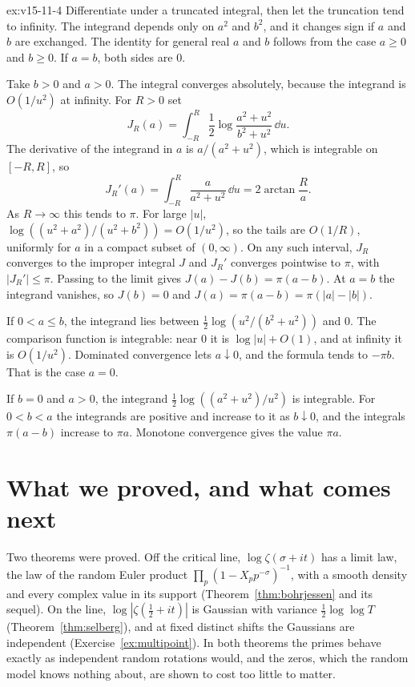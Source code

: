 \begin{solution}{ex:v15-11-4}
\idea Differentiate under a truncated integral, then let the truncation tend to infinity.
\writeup The integrand depends only on \(a^2\) and \(b^2\), and it changes sign if \(a\) and \(b\) are exchanged. The identity for general real \(a\) and \(b\) follows from the case \(a\ge0\) and \(b\ge0\). If \(a=b\), both sides are \(0\).

Take \(b>0\) and \(a>0\). The integral converges absolutely, because the integrand is \(O(1/u^2)\) at infinity. For \(R>0\) set
\[
J_R(a)=\int_{-R}^{R}\frac12\log\frac{a^2+u^2}{b^2+u^2}\,\dd u.
\]
The derivative of the integrand in \(a\) is \(a/(a^2+u^2)\), which is integrable on \([-R,R]\), so
\[
J_R'(a)=\int_{-R}^{R}\frac{a}{a^2+u^2}\,\dd u=2\arctan\frac Ra.
\]
As \(R\to\infty\) this tends to \(\pi\). For large \(|u|\), \(\log((u^2+a^2)/(u^2+b^2))=O(1/u^2)\), so the tails are \(O(1/R)\), uniformly for \(a\) in a compact subset of \((0,\infty)\). On any such interval, \(J_R\) converges to the improper integral \(J\) and \(J_R'\) converges pointwise to \(\pi\), with \(|J_R'|\le\pi\). Passing to the limit gives \(J(a)-J(b)=\pi(a-b)\). At \(a=b\) the integrand vanishes, so \(J(b)=0\) and \(J(a)=\pi(a-b)=\pi(|a|-|b|)\).

If \(0<a\le b\), the integrand lies between \(\tfrac12\log(u^2/(b^2+u^2))\) and \(0\). The comparison function is integrable: near \(0\) it is \(\log|u|+O(1)\), and at infinity it is \(O(1/u^2)\). Dominated convergence lets \(a\downarrow0\), and the formula tends to \(-\pi b\). That is the case \(a=0\).

If \(b=0\) and \(a>0\), the integrand \(\tfrac12\log((a^2+u^2)/u^2)\) is integrable. For \(0<b<a\) the integrands are positive and increase to it as \(b\downarrow0\), and the integrals \(\pi(a-b)\) increase to \(\pi a\). Monotone convergence gives the value \(\pi a\).
\end{solution}

\section{What we proved, and what comes next}

Two theorems were proved. Off the critical line, $\log\zeta(\sigma+it)$ has a limit law, the law of the random Euler product $\prod_p(1-X_pp^{-\sigma})^{-1}$, with a smooth density and every complex value in its support (Theorem~\ref{thm:bohrjessen} and its sequel). On the line, $\log|\zeta(\frac12+it)|$ is Gaussian with variance $\frac12\log\log T$ (Theorem~\ref{thm:selberg}), and at fixed distinct shifts the Gaussians are independent (Exercise~\ref{ex:multipoint}). In both theorems the primes behave exactly as independent random rotations would, and the zeros, which the random model knows nothing about, are shown to cost too little to matter.


